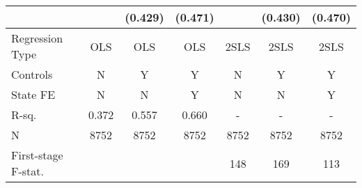 {\begin{tabular}{l*{6}{c}}
                &                  &  (0.429)         &  (0.471)         &                  &  (0.430)         &  (0.470)         \\
\midrule
Regression Type &      OLS         &      OLS         &      OLS         &     2SLS         &     2SLS         &     2SLS         \\
Controls        &        N         &        Y         &        Y         &        N         &        Y         &        Y         \\
State FE        &        N         &        N         &        Y         &        N         &        N         &        Y         \\
R-sq.           &    0.372         &    0.557         &    0.660         &        -         &        -         &        -         \\
N               &     8752         &     8752         &     8752         &     8752         &     8752         &     8752         \\
First-stage F-stat.&                  &                  &                  &      148         &      169         &      113         \\
\bottomrule
\end{tabular}
}
